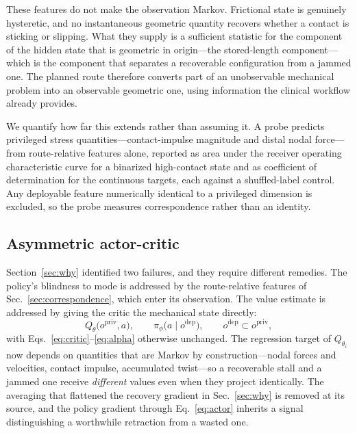 These features do not make the observation Markov. Frictional state is genuinely hysteretic, and no
instantaneous geometric quantity recovers whether a contact is sticking or slipping. What they
supply is a sufficient statistic for the component of the hidden state that is geometric in
origin---the stored-length component---which is the component that separates a recoverable
configuration from a jammed one. The planned route therefore converts part of an unobservable
mechanical problem into an observable geometric one, using information the clinical workflow
already provides.

We quantify how far this extends rather than assuming it. A probe predicts privileged stress
quantities---contact-impulse magnitude and distal nodal force---from route-relative features alone,
reported as area under the receiver operating characteristic curve for a binarized high-contact
state and as coefficient of determination for the continuous targets, each against a shuffled-label
control. Any deployable feature numerically identical to a privileged dimension is excluded, so the
probe measures correspondence rather than an identity.

\subsection{Asymmetric actor-critic}
\label{sec:asymmetric}

Section~\ref{sec:why} identified two failures, and they require different remedies. The policy's
blindness to mode is addressed by the route-relative features of
Sec.~\ref{sec:correspondence}, which enter its observation. The value estimate is addressed by
giving the critic the mechanical state directly:
%
\begin{equation}
Q_{\theta}\big(o^{\mathrm{priv}}, a\big),
\qquad
\pi_{\phi}\big(a \mid o^{\mathrm{dep}}\big),
\qquad
o^{\mathrm{dep}} \subset o^{\mathrm{priv}},
\label{eq:asym}
\end{equation}
%
with Eqs.~\eqref{eq:critic}--\eqref{eq:alpha} otherwise unchanged. The regression target of
$Q_{\theta_i}$ now depends on quantities that are Markov by construction---nodal forces and
velocities, contact impulse, accumulated twist---so a recoverable stall and a jammed one receive
\emph{different} values even when they project identically. The averaging that flattened the
recovery gradient in Sec.~\ref{sec:why} is removed at its source, and the policy gradient through
Eq.~\eqref{eq:actor} inherits a signal distinguishing a worthwhile retraction from a wasted one.

